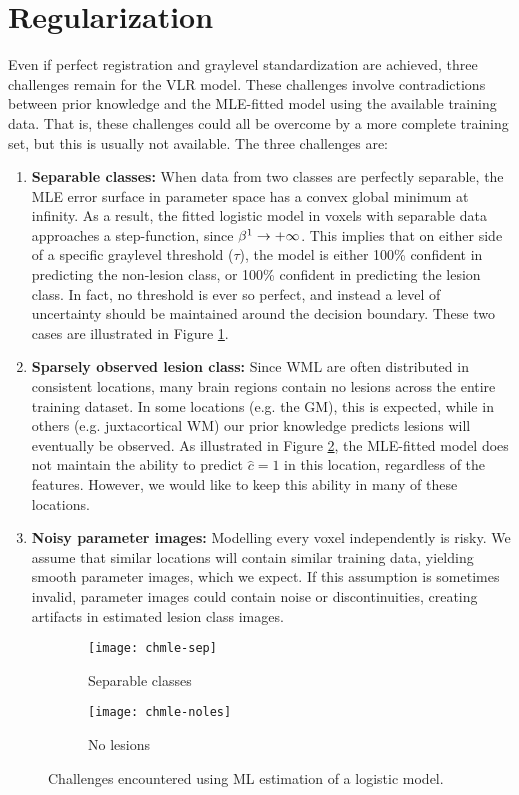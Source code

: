 \section{Regularization}
Even if perfect registration and graylevel standardization are achieved, three challenges remain for the VLR model. These challenges involve contradictions between prior knowledge and the MLE-fitted model using the available training data. That is, these challenges could all be overcome by a more complete training set, but this is usually not available. The three challenges are:
\begin{enumerate}
  \item \label{chmle:separable} \textbf{Separable classes:} 
  When data from two classes are perfectly separable, the MLE error surface in parameter space has a convex global minimum at infinity. As a result, the fitted logistic model in voxels with separable data approaches a step-function, since $\beta^1\rightarrow+\infty$. This implies that on either side of a specific graylevel threshold ($\tau$), the model is either 100\% confident in predicting the non-lesion class, or 100\% confident in predicting the lesion class. In fact, no threshold is ever so perfect, and instead a level of uncertainty should be maintained around the decision boundary. These two cases are illustrated in Figure \ref{fig:chmle-sep}.
  \item \label{chmle:sparse} \textbf{Sparsely observed lesion class:} 
  Since WML are often distributed in consistent locations, many brain regions contain no lesions across the entire training dataset. In some locations (e.g. the GM), this is expected, while in others (e.g. juxtacortical WM) our prior knowledge predicts lesions will eventually be observed. As illustrated in Figure \ref{fig:chmle-noles}, the MLE-fitted model does not maintain the ability to predict $\hat{c} = 1$ in this location, regardless of the features. However, we would like to keep this ability in many of these locations. 
  \item \label{chmle:noisy} \textbf{Noisy parameter images:} 
  Modelling every voxel independently is risky. We assume that similar locations will contain similar training data, yielding smooth parameter images, which we expect. If this assumption is sometimes invalid, parameter images could contain noise or discontinuities, creating artifacts in estimated lesion class images.
\end{enumerate}
\begin{figure}
  \centering
  \begin{subfigure}{\plotwidth}
    \texttt{[image: chmle-sep]}\caption{Separable classes}\label{fig:chmle-sep}
  \end{subfigure}
  \begin{subfigure}{\plotwidth}
    \texttt{[image: chmle-noles]}\caption{No lesions}\label{fig:chmle-noles}
  \end{subfigure}
  \caption{Challenges encountered using ML estimation of a logistic model.}
  \label{fig:chmle}
\end{figure}
